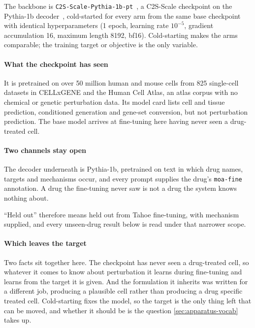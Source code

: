 The backbone is \texttt{C2S-Scale-Pythia-1b-pt}~\cite{c2sscale}, a C2S-Scale
checkpoint on the Pythia-1b decoder~\cite{pythia}, cold-started for every arm
from the same base checkpoint with identical hyperparameters (1 epoch, learning
rate $10^{-5}$, gradient accumulation 16, maximum length 8192,
bf16). Cold-starting
makes the arms comparable; the training target or objective is the only
variable.

\paragraph{What the checkpoint has seen} It is pretrained on over 50 million
human and mouse cells from 825 single-cell datasets in CELLxGENE and the Human
Cell Atlas, an atlas corpus with no chemical or genetic perturbation data. Its
model card lists cell and tissue prediction, conditioned generation and gene-set
conversion, but not perturbation prediction. The base model arrives at
fine-tuning here having never seen a drug-treated cell.

\paragraph{Two channels stay open} The decoder underneath is Pythia-1b,
pretrained on text in which drug names, targets and mechanisms occur, and every
prompt supplies the drug's \texttt{moa-fine} annotation. A drug the fine-tuning
never saw is not a drug the system knows nothing about.

\begin{scopelimit}
``Held out'' therefore means held out from Tahoe fine-tuning, with mechanism
supplied, and every unseen-drug result below is read under that narrower scope.
\end{scopelimit}

\paragraph{Which leaves the target} Two facts sit together here. The checkpoint
has never seen a drug-treated cell, so whatever it comes to know about
perturbation it learns during fine-tuning and learns from the target it is given.
And the formulation it inherits was written for a different job, producing a
plausible cell rather than producing a drug specific treated cell. Cold-starting
fixes the model, so the target is the only thing left that can be moved, and
whether it should be is the question \cref{sec:apparatus-vocab} takes up.

